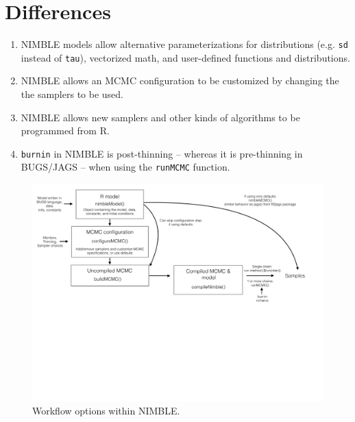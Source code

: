 \documentclass[12pt]{article}
\def\code#1{\texttt{#1}}
\begin{document}
\section{Differences}
\begin{enumerate}
\item NIMBLE models allow alternative parameterizations for
  distributions (e.g. \code{sd} instead of \code{tau}), vectorized
  math, and user-defined functions and distributions.  
\item NIMBLE allows an MCMC configuration to be customized by changing
  the the samplers to be used.
\item NIMBLE allows new samplers and other kinds of algorithms to be
  programmed from R.
\item \code{burnin} in NIMBLE is post-thinning -- whereas it is pre-thinning in
  BUGS/JAGS -- when using the \code{runMCMC} function.
\end{enumerate}

\clearpage
\begin{figure}
  \centering
  \includegraphics[width=.8\textwidth]{figures/nimbleWorkflow.pdf}
  \caption{Workflow options within NIMBLE.}
  \label{fig:wf}
\end{figure}
\clearpage
\end{document}
